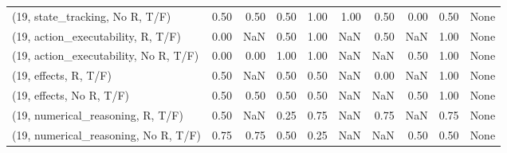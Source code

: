 \begin{table*}[h!]
\begin{adjustbox}{width=2\columnwidth,center}
\begin{tabular}{lrrr|rrr|rrr}
(19, state\_tracking, No R, T/F)       &                      0.50 &                  0.50 &                      0.50 &                          1.00 &                      1.00 &                          0.50 &                                   0.00 &                               0.50 &                                  None \\
(19, action\_executability, R, T/F)    &                      0.00 &                   NaN &                      0.50 &                          1.00 &                       NaN &                          0.50 &                                    NaN &                               1.00 &                                  None \\
(19, action\_executability, No R, T/F) &                      0.00 &                  0.00 &                      1.00 &                          1.00 &                       NaN &                           NaN &                                   0.50 &                               1.00 &                                  None \\
(19, effects, R, T/F)                 &                      0.50 &                   NaN &                      0.50 &                          0.50 &                       NaN &                          0.00 &                                    NaN &                               1.00 &                                  None \\
(19, effects, No R, T/F)              &                      0.50 &                  0.50 &                      0.50 &                          0.50 &                       NaN &                           NaN &                                   0.50 &                               1.00 &                                  None \\
(19, numerical\_reasoning, R, T/F)     &                      0.50 &                   NaN &                      0.25 &                          0.75 &                       NaN &                          0.75 &                                    NaN &                               0.75 &                                  None \\
(19, numerical\_reasoning, No R, T/F)  &                      0.75 &                  0.75 &                      0.50 &                          0.25 &                       NaN &                           NaN &                                   0.50 &                               0.50 &                                  None \\

\end{tabular}
\end{adjustbox}
\end{table*}
